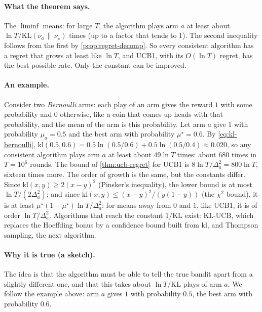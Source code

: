 \paragraph{What the theorem says.} The $\liminf$ means: for large $T$, the
algorithm plays arm $a$ at least about $\ln T / \mathrm{KL}(\nu_a \,\|\,
\nu_\star)$ times (up to a factor that tends to $1$). The second inequality
follows from the first by \cref{prop:regret-decomp}. So every consistent
algorithm has a regret that grows at least like $\ln T$, and UCB1, with its
$O(\ln T)$ regret, has the best possible rate. Only the constant can be
improved.

\paragraph{An example.} Consider two \emph{Bernoulli} arms: each play of an
arm gives the reward $1$ with some probability and $0$ otherwise, like a
coin that comes up heads with that probability, and the mean of the arm is
this probability. Let arm $a$ give $1$ with probability $\mu_a = 0.5$ and
the best arm with probability $\mu^\star = 0.6$. By \eqref{eq:kl-bernoulli},
$\mathrm{kl}(0.5, 0.6) = 0.5 \ln(0.5/0.6) + 0.5 \ln(0.5/0.4) \approx 0.020$,
so any consistent
algorithm plays arm $a$ at least about $49 \ln T$ times: about $680$ times
in $T = 10^6$ rounds. The bound of \cref{thm:ucb-regret} for UCB1 is $8 \ln
T / \Delta_a^2 = 800 \ln T$, sixteen times more. The order of growth is the
same, but the constants differ. Since $\mathrm{kl}(x, y) \geq 2 (x - y)^2$
(Pinsker's inequality), the lower bound is at most $\ln T / (2
\Delta_a^2)$; and since $\mathrm{kl}(x, y) \leq (x - y)^2 / (y (1 - y))$ (the
$\chi^2$ bound), it is at least $\mu^\star (1 - \mu^\star) \ln T /
\Delta_a^2$: for means away from $0$ and $1$, like UCB1, it is of order
$\ln T / \Delta_a^2$. Algorithms
that reach the constant $1/\mathrm{KL}$ exist: KL-UCB, which replaces the
Hoeffding bonus by a confidence bound built from $\mathrm{kl}$, and
Thompson sampling, the next algorithm.

\paragraph{Why it is true (a sketch).} The idea is that the algorithm
must be able to tell the true bandit apart from a slightly different one,
and that this takes about $\ln T / \mathrm{KL}$ plays of arm $a$. We follow
the example above: arm $a$ gives $1$ with probability $0.5$, the best arm
with probability $0.6$.

